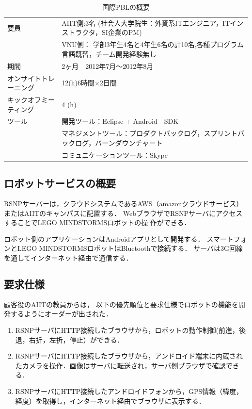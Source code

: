 \documentclass[a4j, 12Q, twocolumn, twoside]{jsarticle}
\begin{document}
\begin{table}[htb]
  \caption{国際PBLの概要}
  \begin{center}
   \small
    \begin{tabular}{|p{}|p{}|}
      \hline
      要員 & AIIT側:3名 (社会人大学院生：外資系ITエンジニア，ITインストラクタ，SI企業のPM) \\
       &VNU側： 学部3年生4名と4年生6名の計10名,各種プログラム言語既習，チーム開発経験無し \\      \hline
      期間 &2ヶ月　2012年7月～2012年8月 \\      \hline
       オンサイトトレーニング & 12(h)6時間×2日間\\      \hline
      キックオフミーティング &4 (h) \\      \hline
            ツール &開発ツール：Eclipse + Android　SDK\\
& マネジメントツール：プロダクトバックログ，スプリントバックログ，バーンダウンチャート\\
&コミュニケーションツール：Skype\\
      \hline
    \end{tabular}
  \end{center}
\end{table}


\subsection{ロボットサービスの概要}
RSNPサーバーは，クラウドシステムであるAWS（amazonクラウドサービス）またはAIITのキャンパスに配置する．
WebブラウザでRSNPサーバにアクセスすることでLEGO MINDSTORMSロボットの操
作ができる．

ロボット側のアプリケーションはAndroidアプリとして開発する．
スマートフォンとLEGO MINDSTORMSロボットはBluetoothで接続する．
サーバは3G回線を通してインターネット経由で通信する．

\subsection{要求仕様}
顧客役のAIITの教員からは，
以下の優先順位と要求仕様でロボットの機能を開発するようにオーダーが出された．
\begin{enumerate}
\item RSNPサーバにHTTP接続したブラウザから，ロボットの動作制御(前進，後退，右折，左折，停止）ができる．
\item RSNPサーバにHTTP接続したブラウザから，アンドロイド端末に内蔵されたカメラを操作．画像はサーバに転送され，サーバ側ブラウザで確認できる．
\item RSNPサーバにHTTP接続したアンドロイドフォンから，GPS情報（緯度，経度）を取得し，インターネット経由でブラウザに表示する．
\end{enumerate}
\end{document}
